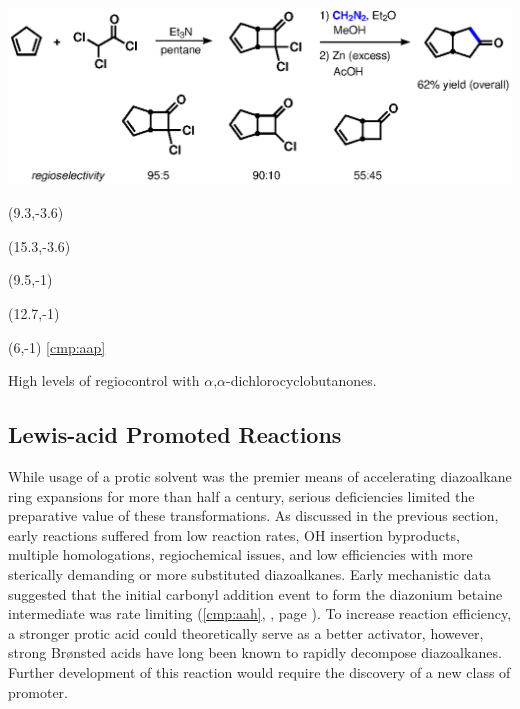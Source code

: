 \begin{Scheme}[h]
  \centering
  \includegraphics[scale=0.8]{chp_diazobkg/images/greene}
  \begin{textblock}{1}(9.3,-3.6)  \end{textblock}
  \begin{textblock}{1}(15.3,-3.6)  \end{textblock}
  \begin{textblock}{1}(9.5,-1)  \end{textblock}
  \begin{textblock}{1}(12.7,-1)  \end{textblock}
  \begin{textblock}{1}(6,-1) \textsf{\scriptsize{\ref{cmp:aap}}} \end{textblock}
  \caption{High levels of regiocontrol with
  $\alpha$,$\alpha$-dichlorocyclobutanones.}
  \label{sch:greene}
\end{Scheme}


\subsection{Lewis-acid Promoted Reactions}
While usage of a protic solvent was the premier means of accelerating diazoalkane ring
expansions for more than half a century, serious deficiencies limited the preparative value of these
transformations. As discussed in the previous section, early reactions suffered from low reaction rates, O\ce{-}H insertion byproducts, multiple homologations, regiochemical issues, and low efficiencies with more sterically demanding or
more substituted diazoalkanes. Early mechanistic data suggested that the initial carbonyl addition
event to form the diazonium betaine intermediate was rate limiting (\ce{->}\ref{cmp:aah},
, page \pageref{sch:mechanism}). To increase reaction efficiency, a stronger
protic acid could theoretically serve as a better activator, however, strong Br\o nsted acids have long been known to rapidly decompose diazoalkanes. Further development of this reaction would
require the discovery of a new class of promoter.


